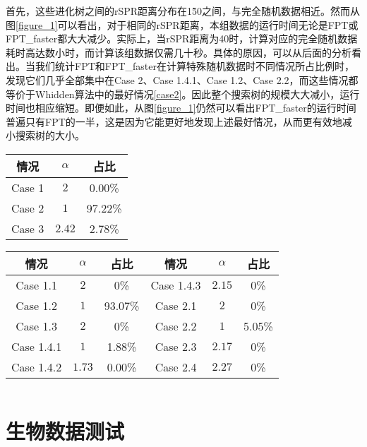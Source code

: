 
首先，这些进化树之间的rSPR距离分布在1\~50之间，与完全随机数据相近。然而从图\ref{figure_1}可以看出，对于相同的rSPR距离，本组数据的运行时间无论是FPT或FPT\_faster都大大减少。实际上，当rSPR距离为40时，计算对应的完全随机数据耗时高达数小时，而计算该组数据仅需几十秒。具体的原因，可以从后面的分析看出。当我们统计FPT和FPT\_faster在计算特殊随机数据时不同情况所占比例时，发现它们几乎全部集中在Case 2、Case 1.4.1、Case 1.2、Case 2.2，而这些情况都等价于Whidden算法中的最好情况\ref{case2}。因此整个搜索树的规模大大减小，运行时间也相应缩短。即便如此，从图\ref{figure_1}仍然可以看出FPT\_faster的运行时间普遍只有FPT的一半，这是因为它能更好地发现上述最好情况，从而更有效地减小搜索树的大小。


\begin{center}
\begin{table}[htpb]
\parbox{.34\linewidth}{
\centering
{}
\begin{tabular}{ c c c}
  \hline
      情况 & $\alpha$ & 占比\\  \hline
      Case 1 & $2$ & 0.00\% \\
      Case 2 & $1$ & 97.22\%\\
      Case 3 & $2.42$ & 2.78\% \\
  \hline
\end{tabular}
}
\hfill
\parbox{.6\linewidth}{
\centering
{}
\begin{tabular}{ c c c | c c c }
  \hline
      情况 & $\alpha$ & 占比 & 情况 & $\alpha$ & 占比\\  \hline
      Case 1.1 & $2$ & 0\% & Case 1.4.3 & $2.15$ &0\%  \\
      Case 1.2 & $1$ & 93.07\% & Case 2.1 & $2$ & 0\% \\
      Case 1.3 & $2$ & 0\% & Case 2.2 & $1$ & 5.05\% \\
      Case 1.4.1 & $1$ & 1.88\%  & Case 2.3 & $2.17$ & 0\% \\
      Case 1.4.2 & $1.73$ & 0.00\% & Case 2.4 & $2.27$ & 0\% \\
  \hline
\end{tabular}
}
\end{table}
\end{center}

$ $\\
\section{生物数据测试}

